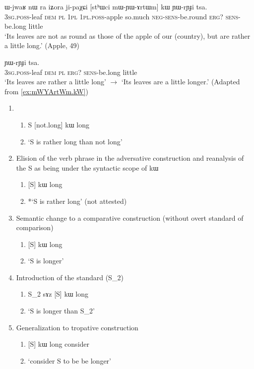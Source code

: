 \documentclass[oldfontcommands,oneside,a4paper,11pt]{article}
\newcommand{\ipa}[1]{{\phon #1}} %
\begin{document}
\begin{exe}
  \ex  \label{ex:mWYArtWm.kW}  
  \gll      
\ipa{ɯ-jwaʁ} 	\ipa{nɯ} \ipa{ra} 	\ipa{iʑora} 	\ipa{ji-paχɕi} 	[\ipa{stʰɯci} 	\ipa{mɯ-ɲɯ-ɤrtɯm}] 	\ipa{kɯ} 	\ipa{ɲɯ-rɲɟi} 	\ipa{tsa.} \\
\textsc{3sg.poss}-leaf \textsc{dem} \textsc{pl} \textsc{1pl} \textsc{1pl.poss}-apple so.much \textsc{neg-sens}-be.round \textsc{erg?} \textsc{sens}-be.long little \\
\glt `Its leaves  are not as round as those of the apple of our (country), but are rather a little long.'
(Apple, 49)
\end{exe} 


 \begin{exe}
  \ex  \label{ex:mWYArtWm.kW3}  
  \gll      
[\ipa{ɯ-jwaʁ} 	\ipa{nɯ}   \ipa{ra}] 	\ipa{kɯ} 	\ipa{ɲɯ-rɲɟi} 	\ipa{tsa.} \\
\textsc{3sg.poss}-leaf \textsc{dem} \textsc{pl}   \textsc{erg?} \textsc{sens}-be.long little \\
\glt *`Its leaves are rather a little long'  $\rightarrow$  `Its leaves are a little longer.'
(Adapted from \ref{ex:mWYArtWm.kW})
          \end{exe} 


\begin{enumerate} 
\item 
\begin{enumerate} 
\item S [not.long] \ipa{kɯ} long 
\item `S is rather long than not long'
\end{enumerate} 
\item Elision of the verb phrase in the adversative construction  and reanalysis of the S as being under the syntactic scope of \ipa{kɯ}
\begin{enumerate} 
\item{} [S] \ipa{kɯ} long  
\item *`S is rather long' (not attested)
\end{enumerate} 
\item Semantic change to a comparative construction (without overt standard of comparison)
\begin{enumerate} 
\item{} [S] \ipa{kɯ} long  
\item `S is longer'  
\end{enumerate} 
\item Introduction of the standard (S_2)
\begin{enumerate} 
\item{} S_2 \ipa{sɤz} [S] \ipa{kɯ} long  
\item  `S is longer than S_2'
\end{enumerate} 
\item Generalization to tropative construction
\begin{enumerate} 
\item{}  [S] \ipa{kɯ} long  consider  
\item  `consider S to be be longer'
\end{enumerate}  
\end{enumerate}
\end{document}
